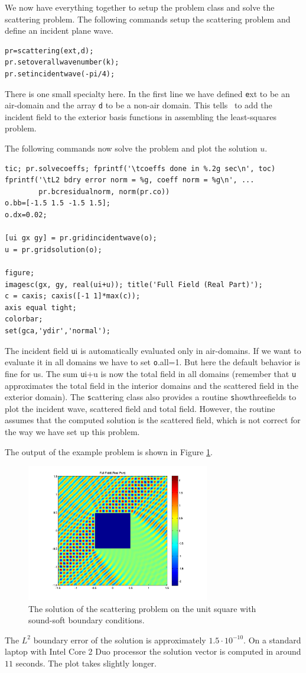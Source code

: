 We now have everything together to setup the problem class and solve
the scattering problem. The following commands setup the scattering
problem and define an incident plane wave.
\begin{verbatim}
pr=scattering(ext,d);
pr.setoverallwavenumber(k);
pr.setincidentwave(-pi/4);
\end{verbatim}
There is one small specialty here. In the first line we have 
defined {\texttt ext} to be an air-domain and the array {\texttt d} to
be a non-air domain. This tells \mpspack~to add the incident field to
the exterior basis functions in assembling the least-squares problem.

The following commands now solve the problem and plot the solution
$u$.
\begin{verbatim}
tic; pr.solvecoeffs; fprintf('\tcoeffs done in %.2g sec\n', toc)
fprintf('\tL2 bdry error norm = %g, coeff norm = %g\n', ...
        pr.bcresidualnorm, norm(pr.co))
o.bb=[-1.5 1.5 -1.5 1.5];
o.dx=0.02;

[ui gx gy] = pr.gridincidentwave(o);
u = pr.gridsolution(o);

figure;
imagesc(gx, gy, real(ui+u)); title('Full Field (Real Part)');
c = caxis; caxis([-1 1]*max(c));
axis equal tight;
colorbar;
set(gca,'ydir','normal'); 
\end{verbatim}
The incident field {\texttt ui} 
is automatically evaluated only in air-domains. If
we want to evaluate it in all domains we have to set {\texttt
  o.all=1}. But here the default behavior is fine for us. The sum
{\texttt ui+u} is now the total field in all domains (remember that
{\texttt u} approximates the total field in the interior domains
and the scattered field in the exterior domain). The {\texttt
  scattering} class also provides a routine {\texttt showthreefields}
to plot the incident wave, scattered field and total field. However,
the routine assumes that the computed solution is the scattered field,
which is not correct for the way we have set up this problem.

The output of the example problem is shown in Figure \ref{fig:squareplot}.
\begin{figure}
\center
\includegraphics[width=8cm]{squareplot}
\caption{The solution of the scattering problem on the unit
  square with sound-soft boundary conditions.}
\label{fig:squareplot}
\end{figure}
The $L^2$ boundary error of the solution is approximately $1.5\cdot
10^{-10}$. On a standard laptop with Intel Core 2 Duo processor the
solution vector is computed in around $11$ seconds. The plot takes
slightly longer.

